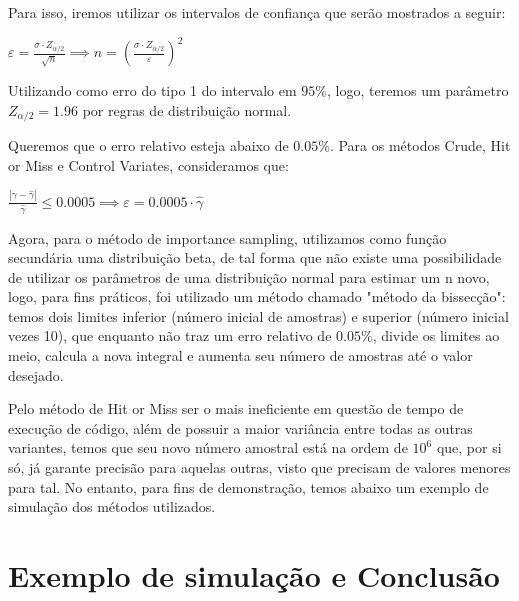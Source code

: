 \documentclass[a4paper]{article}
\begin{document}
Para isso, iremos utilizar os intervalos de confiança que serão mostrados a seguir:


\begin{center}

$\varepsilon = \frac{\sigma\cdot Z_{\alpha/2}}{\sqrt{n}} \implies n = (\frac{\sigma\cdot Z_{\alpha/2}}{\varepsilon})^2$

\end{center}

Utilizando como erro do tipo 1 do intervalo em $95\%$, logo, teremos um parâmetro $Z_{\alpha/2} = 1.96$ por regras de distribuição normal.

Queremos que o erro relativo esteja abaixo de $0.05\%$. Para os métodos Crude, Hit or Miss e Control Variates, consideramos que:

\begin{center}

$\frac{|\gamma - \hat{\gamma}|}{\hat{\gamma}} \le 0.0005 \implies \varepsilon = 0.0005\cdot \hat{\gamma}$

\end{center}

Agora, para o método de importance sampling, utilizamos como função secundária uma distribuição beta, de tal forma que não existe uma possibilidade de utilizar os parâmetros de uma distribuição normal para estimar um n novo, logo, para fins práticos, foi utilizado um método chamado "método da bissecção": temos dois limites inferior (número inicial de amostras) e superior (número inicial vezes 10), que enquanto não traz um erro relativo de $0.05\%$, divide os limites ao meio, calcula a nova integral e aumenta seu número de amostras até o valor desejado.

Pelo método de Hit or Miss ser o mais ineficiente em questão de tempo de execução de código, além de possuir a maior variância entre todas as outras variantes, temos que seu novo número amostral está na ordem de $10^6$ que, por si só, já garante precisão para aquelas outras, visto que precisam de valores menores para tal. No entanto, para fins de demonstração, temos abaixo um exemplo de simulação dos métodos utilizados.

\section{Exemplo de simulação e Conclusão}
\end{document}
